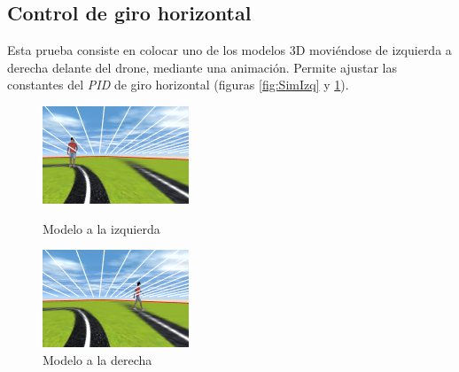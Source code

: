 \subsection*{Control de giro horizontal}
Esta prueba consiste en colocar uno de los modelos 3D moviéndose de izquierda a derecha delante del drone, mediante una animación. Permite ajustar las constantes del \textit{PID} de giro horizontal (figuras \ref{fig:SimIzq} y \ref{fig:SimDer}).

\begin{figure}[!htb]
    \includegraphics[width=\linewidth]{figures/simulado/izq.png}
    \caption{Modelo a la izquierda}\label{fig:SimIzq}
\endminipage\hfill
{}
    \includegraphics[width=\linewidth]{figures/simulado/der.png}
    \caption{Modelo a la derecha}\label{fig:SimDer}
\endminipage\hfill
\end{figure}

